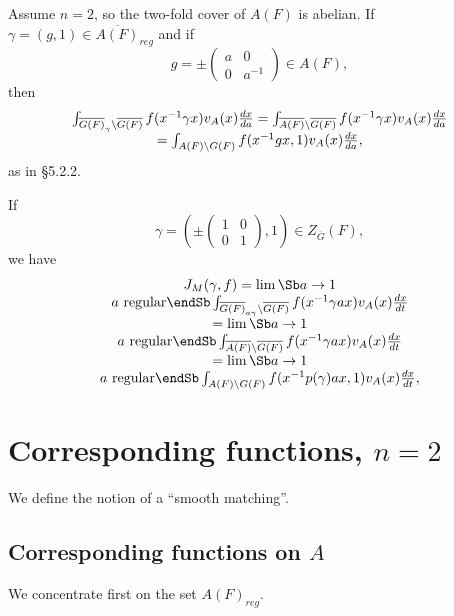 Assume $n=2$, so the two-fold cover of $A(F)$ is abelian.
If $\gamma =(g,1)\in \overline{A(F)}_{reg}$ and if
\[
g=
\pm \left(
\begin{array}{cc}
a & 0\\
0 & a^{-1}
\end{array}
\right)
\in A(F),
\]
then 
\begin{equation}
\begin{array}{c}
\int_{\overline{G(F)}_\gamma\backslash \overline{G(F)}}
f(x^{-1}\gamma x)v_A(x){dx\over da}
=\int_{\overline{A(F)}\backslash \overline{G(F)}}
f(x^{-1}\gamma x)v_A(x){dx\over da}\\
=\int_{A(F)\backslash G(F)}
f(x^{-1}gx,1)v_A(x){dx\over da},
\end{array}
\end{equation}
as in \S 5.2.2.

If
\[
\gamma=
(
\pm \left(
\begin{array}{cc}
1 & 0\\
0 & 1
\end{array}
\right)
,1)\in Z_{\overline{G}}(F),
\]
we have
\begin{equation}
\begin{array}{c}
J_M(\gamma,f)=
\lim\Sb a\rightarrow 1\\ a\ {\rm regular}\endSb
\int_{\overline{G(F)}_{a\gamma}\backslash \overline{G(F)}}
f(x^{-1}\gamma a x)v_A(x){dx\over dt}\\
=\lim\Sb a\rightarrow 1\\ a\ {\rm regular}\endSb
\int_{\overline{A(F)}\backslash \overline{G(F)}}
f(x^{-1}\gamma a x)v_A(x){dx\over dt}\\
=\lim\Sb a\rightarrow 1\\ a\ {\rm regular}\endSb
\int_{A(F)\backslash G(F)}
f(x^{-1}p(\gamma)a x,1)v_A(x){dx\over dt},
\end{array}
\end{equation}

\section{Corresponding functions, $n=2$}

We define the notion of a ``smooth matching''.

\subsection{Corresponding functions on $A$}

We concentrate first on
the set $A(F)_{reg}$.

